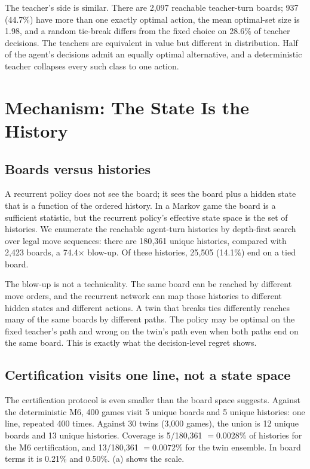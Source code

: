 \documentclass[conference]{IEEEtran}
\begin{document}
The teacher's side is similar. There are 2{,}097 reachable teacher-turn boards; 937 (44.7\%) have more than one exactly optimal action, the mean optimal-set size is 1.98, and a random tie-break differs from the fixed choice on 28.6\% of teacher decisions. The teachers are equivalent in value but different in distribution. Half of the agent's decisions admit an equally optimal alternative, and a deterministic teacher collapses every such class to one action.

\section{Mechanism: The State Is the History}
\label{sec:mechanism}

\subsection{Boards versus histories}
A recurrent policy does not see the board; it sees the board plus a hidden state that is a function of the ordered history. In a Markov game the board is a sufficient statistic, but the recurrent policy's effective state space is the set of histories. We enumerate the reachable agent-turn histories by depth-first search over legal move sequences: there are 180{,}361 unique histories, compared with 2{,}423 boards, a 74.4$\times$ blow-up. Of these histories, 25{,}505 (14.1\%) end on a tied board.

The blow-up is not a technicality. The same board can be reached by different move orders, and the recurrent network can map those histories to different hidden states and different actions. A twin that breaks ties differently reaches many of the same boards by different paths. The policy may be optimal on the fixed teacher's path and wrong on the twin's path even when both paths end on the same board. This is exactly what the decision-level regret shows.

\subsection{Certification visits one line, not a state space}
The certification protocol is even smaller than the board space suggests. Against the deterministic M6, 400 games visit 5 unique boards and 5 unique histories: one line, repeated 400 times. Against 30 twins (3{,}000 games), the union is 12 unique boards and 13 unique histories. Coverage is 5/180{,}361 $=0.0028\%$ of histories for the M6 certification, and 13/180{,}361 $=0.0072\%$ for the twin ensemble. In board terms it is 0.21\% and 0.50\%. (a) shows the scale.
\end{document}
